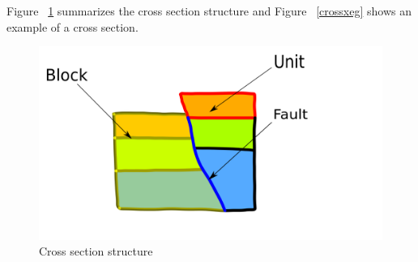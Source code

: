 \documentclass[12pt, a4paper]{report} %
\begin{document}
Figure ~\ref{geostruct} summarizes the cross section structure and Figure ~\ref{crossxeg} shows  an example of a cross section.
 \begin{figure}[H]
	\centering
	\includegraphics[scale=0.3]{geologyStructEdit.png}
	\caption{Cross section structure}
	\label{geostruct}
\end{figure}
\end{document}

